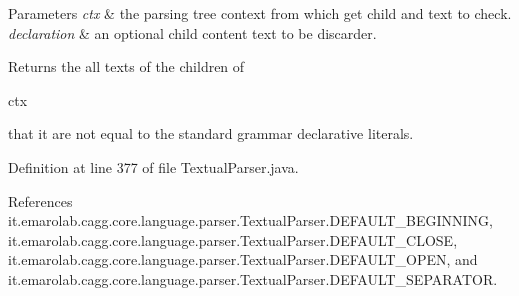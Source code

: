 \begin{DoxyParams}{Parameters}
{\em ctx} & the parsing tree context from which get child and text to check. \\
\hline
{\em declaration} & an optional child content text to be discarder. \\
\hline
\end{DoxyParams}
\begin{DoxyReturn}{Returns}
the all texts of the children of
\begin{DoxyCode}
ctx 
\end{DoxyCode}
 that it are not equal to the standard grammar declarative literals. 
\end{DoxyReturn}


Definition at line 377 of file Textual\-Parser.\-java.



References it.\-emarolab.\-cagg.\-core.\-language.\-parser.\-Textual\-Parser.\-D\-E\-F\-A\-U\-L\-T\-\_\-\-B\-E\-G\-I\-N\-N\-I\-N\-G, it.\-emarolab.\-cagg.\-core.\-language.\-parser.\-Textual\-Parser.\-D\-E\-F\-A\-U\-L\-T\-\_\-\-C\-L\-O\-S\-E, it.\-emarolab.\-cagg.\-core.\-language.\-parser.\-Textual\-Parser.\-D\-E\-F\-A\-U\-L\-T\-\_\-\-O\-P\-E\-N, and it.\-emarolab.\-cagg.\-core.\-language.\-parser.\-Textual\-Parser.\-D\-E\-F\-A\-U\-L\-T\-\_\-\-S\-E\-P\-A\-R\-A\-T\-O\-R.

